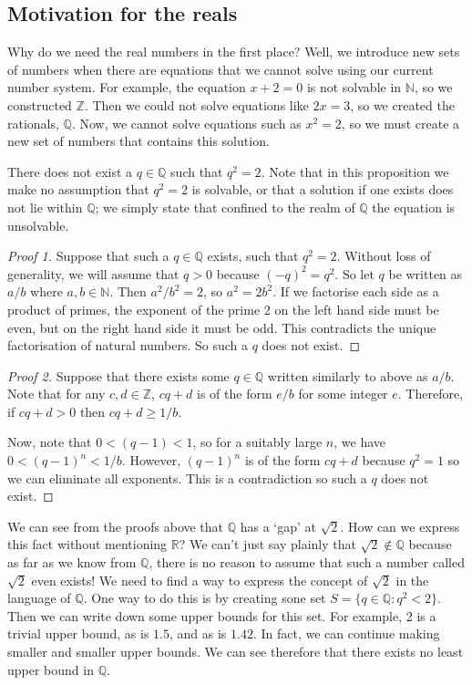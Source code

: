 \subsection{Motivation for the reals}
Why do we need the real numbers in the first place?
Well, we introduce new sets of numbers when there are equations that we cannot solve using our current number system.
For example, the equation \(x+2=0\) is not solvable in \(\mathbb N\), so we constructed \(\mathbb Z\).
Then we could not solve equations like \(2x = 3\), so we created the rationals, \(\mathbb Q\).
Now, we cannot solve equations such as \(x^2 = 2\), so we must create a new set of numbers that contains this solution.

\begin{proposition}
	There does not exist a \(q \in \mathbb Q\) such that \(q^2 = 2\).
	Note that in this proposition we make no assumption that \(q^2 = 2\) is solvable, or that a solution if one exists does not lie within \(\mathbb Q\); we simply state that confined to the realm of \(\mathbb Q\) the equation is unsolvable.
\end{proposition}
\begin{proof}[Proof 1]
	Suppose that such a \(q \in \mathbb Q\) exists, such that \(q^2 = 2\).
	Without loss of generality, we will assume that \(q>0\) because \((-q)^2 = q^2\).
	So let \(q\) be written as \(a/b\) where \(a, b \in \mathbb N\).
	Then \(a^2/b^2 = 2\), so \(a^2 = 2b^2\).
	If we factorise each side as a product of primes, the exponent of the prime 2 on the left hand side must be even, but on the right hand side it must be odd.
	This contradicts the unique factorisation of natural numbers.
	So such a \(q\) does not exist.
\end{proof}
\begin{proof}[Proof 2]
	Suppose that there exists some \(q \in \mathbb Q\) written similarly to above as \(a/b\).
	Note that for any \(c, d \in \mathbb Z\), \(cq + d\) is of the form \(e/b\) for some integer \(e\).
	Therefore, if \(cq+d>0\) then \(cq+d \geq 1/b\).

	Now, note that \(0 < (q - 1) < 1\), so for a suitably large \(n\), we have \(0 < (q - 1)^n < 1/b\).
	However, \((q-1)^n\) is of the form \(cq+d\) because \(q^2 = 1\) so we can eliminate all exponents.
	This is a contradiction so such a \(q\) does not exist.
\end{proof}
We can see from the proofs above that \(\mathbb Q\) has a `gap' at \(\sqrt 2\).
How can we express this fact without mentioning \(\mathbb R\)?
We can't just say plainly that \(\sqrt 2 \notin \mathbb Q\) because as far as we know from \(\mathbb Q\), there is no reason to assume that such a number called \(\sqrt 2\) even exists!
We need to find a way to express the concept of \(\sqrt 2\) in the language of \(\mathbb Q\).
One way to do this is by creating sone set \(S = \{ q \in \mathbb Q: q^2 < 2 \}\).
Then we can write down some upper bounds for this set.
For example, 2 is a trivial upper bound, as is \(1.5\), and as is \(1.42\).
In fact, we can continue making smaller and smaller upper bounds.
We can see therefore that there exists no least upper bound in \(\mathbb Q\).

